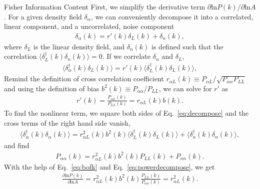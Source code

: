 \begin{section}{Fisher Information Content}
  First, we simplify the derivative term
  $\partial \mathrm{ln} P(k)/\partial\mathrm{ln} A$.  For a given density field $\delta_\alpha$, we can
  conveniently decompose it into a correlated, linear component,
  and a uncorrelated, noise component
  \begin{align}
    \delta_{\alpha}(k) = r'(k) \delta_L (k) + \delta_{n}(k),
    \label{eq:decompose}
  \end{align}
  where $\delta_L$ is the linear density field, and $\delta_{n}(k)$ is defined such that the correlation
  $\langle \delta_L^\dagger(k)\delta_{n}(k) \rangle=0$.  If we correlate
  $\delta_\alpha$ and $\delta_L$,
  \begin{align}
    \langle \delta_\alpha^\dagger(k)\delta_L(k) \rangle = r'(k) \langle \delta_L^\dagger(k)\delta_L(k) \rangle,
    \label{eq:correlating}
  \end{align} 
  Remind the definition of cross correlation coefficient $r_{\alpha L}(k)\equiv P_{\alpha L}/\sqrt{P_{\alpha\alpha}P_{LL}}$ 
  and using the definition of bias $b^2(k)\equiv P_{\alpha\alpha}/P_{LL}$, we can solve for $r'$ as
  \begin{align}
    r'(k) = \frac{P_{\alpha L}(k)}{P_{LL}(k)}=r_{\alpha L}(k) b(k).
    \label{eq:bofk}                                              
  \end{align}                                                    
  To find the nonlinear term, we square both sides of Eq.~\ref{eq:decompose}
  and the cross terms of the right hand side vanish,             
  \begin{align}                                                  
    \langle \delta_\alpha^\dagger(k) \delta_\alpha(k) \rangle =  
    r_{\alpha L}^2(k)b^2(k) \langle \delta_L^\dagger(k) \delta_L(k) \rangle + 
    \langle \delta_{n}^\dagger(k)\delta_{n}(k) \rangle,          
  \end{align}                                                    
  and find                                                       
  \begin{align}                                                  
    P_{\alpha\alpha}(k) = r_{\alpha L}^2(k)b^2(k)P_{LL}(k) + P_{nn}(k).
    \label{eq:powerdecompose}                                    
  \end{align}                                                    
  With the help of Eq.~\ref{eq:bofk} and Eq.~\ref{eq:powerdecompose},
  we get                                                         
  \begin{align}                                                  
    \frac{\partial \mathrm{ln} P(k) }{ \partial \mathrm{ln} A}=
    r^2_{\alpha L}(k)b^2(k)\frac{P_{LL}(k)}{P_{\alpha\alpha}(k)}=r^2_{\alpha L}(k).
  \end{align}


\end{section}
